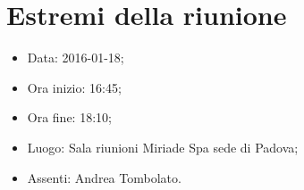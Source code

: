 \documentclass[../template.tex]{subfiles}
\begin{document}
\section{Estremi della riunione}
	\begin{itemize}
		\item Data: 2016-01-18;
		\item Ora inizio: 16:45;
		\item Ora fine: 18:10;
		\item Luogo: Sala riunioni Miriade Spa sede di Padova;
		\item Assenti: Andrea Tombolato.
	\end{itemize}
\end{document}
